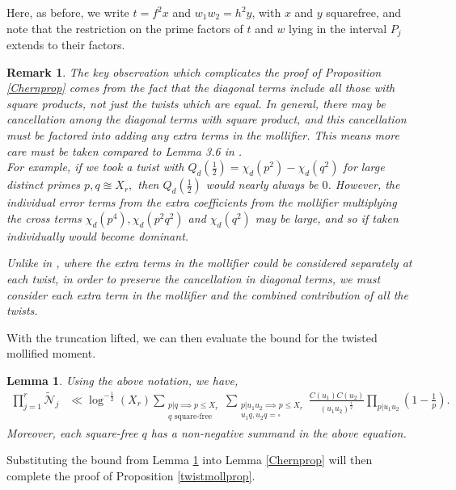 \documentclass[12pt]{amsart}
\numberwithin{equation}{section}
\newtheorem{lem}[thm]{Lemma}
\newtheorem*{rem}{Remark}
\numberwithin{thm}{section}
\newcommand{\1}{\mathbf 1}
\begin{document}
Here, as before, we write $t=f^2x$ and $w_1w_2=h^2y$, with $x$ and $y$ squarefree, and note that the restriction on the prime factors of $t$ and $w$ lying in the interval $P_j$ extends to their factors.
 
\begin{rem}
	
	The key observation which complicates the proof of Proposition \ref{Chernprop} comes from the fact that the diagonal terms include all those with square products, not just the twists which are equal. 
In general, there may be cancellation among the diagonal terms with square product, and this cancellation must be factored into adding any extra terms in the mollifier. This means more care must be taken   compared to Lemma 3.6 in \cite{AC25}. \\ For example, if we took a twist with $Q_d(\frac{1}{2})=\chi_d(p^2)-\chi_d(q^2)$ for large distinct primes $p,q\approxeq X_r,$ then  $Q_d(\frac{1}{2})$ would nearly always be $0$. However, the individual error terms from the extra coefficients from the mollifier multiplying the cross terms $\chi_d(p^4), \chi_d(p^2q^2)$ and $\chi_d(q^2)$ may be large, and so if taken individually would become dominant.
	
	Unlike in \cite{AC25}, where the extra terms in the mollifier could be considered separately at each twist, in order to preserve the cancellation in diagonal terms, we must consider each extra term in the mollifier and the combined contribution of all the twists.
\end{rem}


With the truncation lifted, we can then evaluate the bound for the twisted mollified moment.  

\begin{lem}\label{twistmoll}
	Using the above notation, we have,
	\begin{align}\label{wellfactorconj}
		\prod^{r}_{j=1}\tilde{\mathscr{N}}_j&\ll\log ^{-\frac{1}{2}}(X_r)\sum_{\substack{p|q\implies p\le X_r\\ q\text{ square-free}}}\sum_{\substack{p|u_1u_2\implies p\le X_r\\ u_1q,u_2q=\square}} \frac{C(u_1)C(u_2)}{(u_1u_2)^{\frac{1}{2}}}\prod_{p|u_1u_2}\left(1-\frac{1}{p
		}\right).
	\end{align}
	Moreover, each square-free $q$ has a non-negative summand in the above equation. 
\end{lem}
 
Substituting the bound from Lemma \ref{twistmoll} into Lemma \ref{Chernprop} will then complete the proof of Proposition \ref{twistmollprop}.
\end{document}

